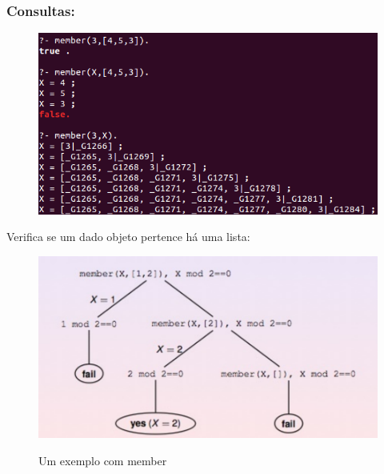 \documentclass[sans]{beamer}
\begin{document}
\begin{frame}
\frametitle{Consultas:}

\begin{figure}[!htb]
\centering
\includegraphics[scale = 0.7]{figuras/listaconsultas.png}
\label{listaconsultas}
\end{figure}
 
\end{frame}


\begin{frame}
\begin{block}{Verifica se um dado objeto pertence há uma lista:}


    
\begin{figure}[!htb]
\centering
\includegraphics[scale = 0.5]{figuras/arv_member_mod.pdf}
\label{fig_arv_member_mod}
\caption{Um exemplo com member}
\end{figure}

\end{block}
\end{frame}
\end{document}
